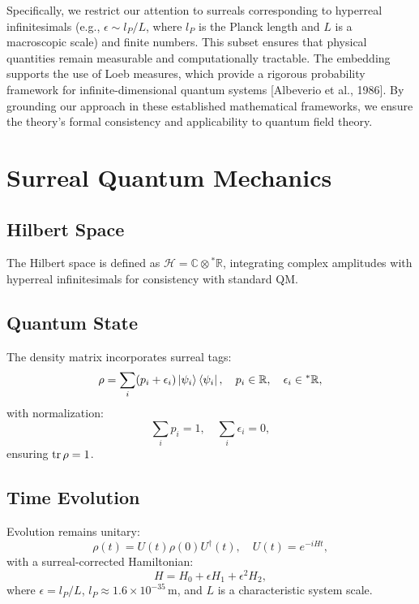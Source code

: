 \documentclass{article}
\begin{document}
Specifically, we restrict our attention to surreals corresponding to hyperreal infinitesimals (e.g., \(\epsilon \sim l_P / L\), where \(l_P\) is the Planck length and \(L\) is a macroscopic scale) and finite numbers. This subset ensures that physical quantities remain measurable and computationally tractable. The embedding supports the use of Loeb measures, which provide a rigorous probability framework for infinite-dimensional quantum systems [Albeverio et al., 1986]. By grounding our approach in these established mathematical frameworks, we ensure the theory’s formal consistency and applicability to quantum field theory.

\section{Surreal Quantum Mechanics}
\subsection{Hilbert Space}
The Hilbert space is defined as \(\mathcal{H} = \mathbb{C} \otimes {}^*\mathbb{R}\), integrating complex amplitudes with hyperreal infinitesimals for consistency with standard QM.

\subsection{Quantum State}
The density matrix incorporates surreal tags:
\begin{equation}
\rho = \sum_i (p_i + \epsilon_i) \ket{\psi_i}\bra{\psi_i}, \quad p_i \in \mathbb{R}, \quad \epsilon_i \in {}^*\mathbb{R},
\end{equation}
with normalization:
\begin{equation}
\sum_i p_i = 1, \quad \sum_i \epsilon_i = 0,
\end{equation}
ensuring \(\tr \rho = 1\).

\subsection{Time Evolution}
Evolution remains unitary:
\begin{equation}
\rho(t) = U(t) \rho(0) U^\dagger(t), \quad U(t) = e^{-i H t},
\end{equation}
with a surreal-corrected Hamiltonian:
\begin{equation}
H = H_0 + \epsilon H_1 + \epsilon^2 H_2,
\end{equation}
where \(\epsilon = l_P / L\), \(l_P \approx 1.6 \times 10^{-35} \, \text{m}\), and \(L\) is a characteristic system scale.
\end{document}
